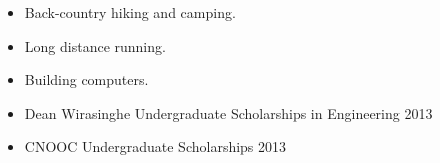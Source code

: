 \documentclass[12pt]{article} %
\begin{document}
\bigskip
{}
\medskip
\begin{itemize}
\item Back-country hiking and camping.
\item Long distance running.
\item Building computers.
\end{itemize}
\bigskip

\medskip
\noindent
\begin{itemize}[noitemsep]
\item Dean Wirasinghe Undergraduate Scholarships in Engineering 2013
\item CNOOC Undergraduate Scholarships 2013
\end{itemize}
\end{document}
